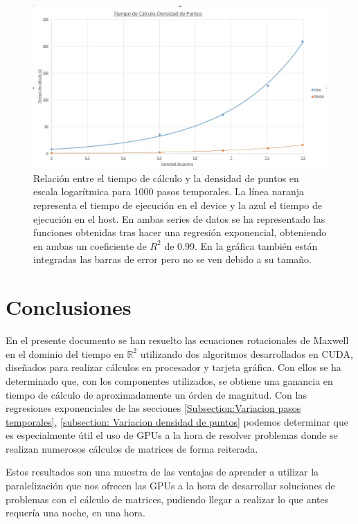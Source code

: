 \documentclass[11pt,a4paper,twoside,pdf]{article}
\numberwithin{equation}{section}
\begin{document}
\begin{figure}[h]
\centering
\includegraphics[width=15 cm]{T-Densidad_de_Puntos.jpg}				
\caption{Relación entre el tiempo de cálculo y la densidad de puntos en escala logarítmica para 1000 pasos temporales. La línea naranja representa el tiempo de ejecución en el device y la azul el tiempo de ejecución en el host. En ambas series de datos se ha representado las funciones obtenidas tras hacer una regresión exponencial, obteniendo en ambas un coeficiente de $R^2$ de 0.99. En la gráfica también están integradas las barras de error pero no se ven debido a su tamaño.}
\label{fig:t-densidad_de_puntos}
\end{figure}
\noindent









\section{Conclusiones}


En el presente documento se han resuelto las ecuaciones rotacionales de Maxwell en el dominio del tiempo en $\mathbb R^{2}$ utilizando dos algoritmos desarrollados en CUDA, diseñados para realizar cálculos en procesador y tarjeta gráfica. Con ellos se ha determinado que, con los componentes utilizados, se obtiene una ganancia en tiempo de cálculo de aproximadamente un órden de magnitud. Con las regresiones exponenciales de las secciones \ref{Subsection:Variacion pasos temporales}, \ref{subsection: Variacion densidad de puntos} podemos determinar que es especialmente útil el uso de GPUs a la hora de resolver problemas donde se realizan numerosos cálculos de matrices de forma reiterada.

Estos resultados son una muestra de las ventajas de aprender a utilizar la paralelización que nos ofrecen las GPUs a la hora de desarrollar soluciones de problemas con el cálculo de matrices, pudiendo llegar a realizar lo que antes requería una noche, en una hora.
\end{document}
